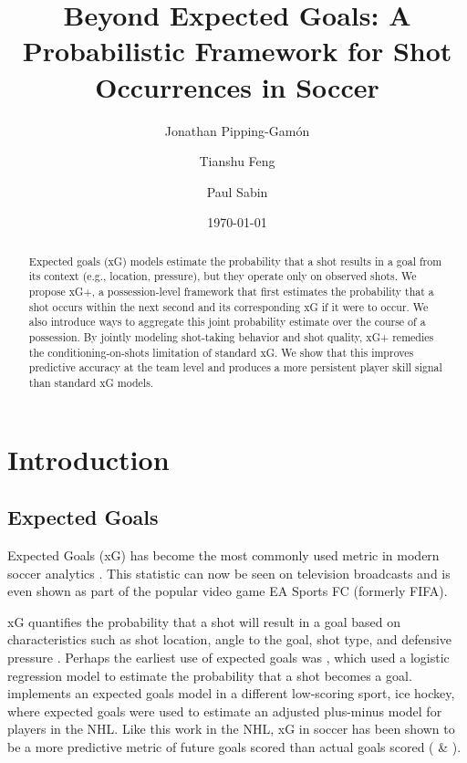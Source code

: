 \documentclass[12pt,letterpaper]{article}
\title{Beyond Expected Goals: A Probabilistic Framework for Shot Occurrences in Soccer}
\author[1]{Jonathan Pipping-Gam\'on}
\author[2]{Tianshu Feng}
\author[1]{Paul Sabin}
\affil[1]{\small Department of Statistics \& Data Science, University of Pennsylvania}
\affil[2]{\small Department of Computer \& Information Science, University of Pennsylvania}
\date{\today}
\begin{document}
\maketitle

\begin{abstract}
Expected goals (xG) models estimate the probability that a shot results in a goal from its context (e.g., location, pressure), but they operate only on observed shots. We propose xG+, a possession-level framework that first estimates the probability that a shot occurs within the next second and its corresponding xG if it were to occur. We also introduce ways to aggregate this joint probability estimate over the course of a possession. By jointly modeling shot-taking behavior and shot quality, xG+ remedies the conditioning-on-shots limitation of standard xG. We show that this improves predictive accuracy at the team level and produces a more persistent player skill signal than standard xG models.
\end{abstract}

\section{Introduction}

\subsection{Expected Goals}

Expected Goals (xG) has become the most commonly used metric in modern soccer analytics \citep{eggels2016expected}. This statistic can now be seen on television broadcasts and is even shown as part of the popular video game EA Sports FC (formerly FIFA). 

xG quantifies the probability that a shot will result in a goal based on characteristics such as shot location, angle to the goal, shot type, and defensive pressure \citep{spearman2018beyond}. Perhaps the earliest use of expected goals was \cite{ensum2004applications}, which used a logistic regression model to estimate the probability that a shot becomes a goal. \cite{macdonald2012expected} implements an expected goals model in a different low-scoring sport, ice hockey, where expected goals were used to estimate an adjusted plus-minus model for players in the NHL. Like this work in the NHL, xG in soccer has been shown to be a more predictive metric of future goals scored than actual goals scored (\cite{heuer2012perfect} \& \cite{mead2023expected}). 
\end{document}
